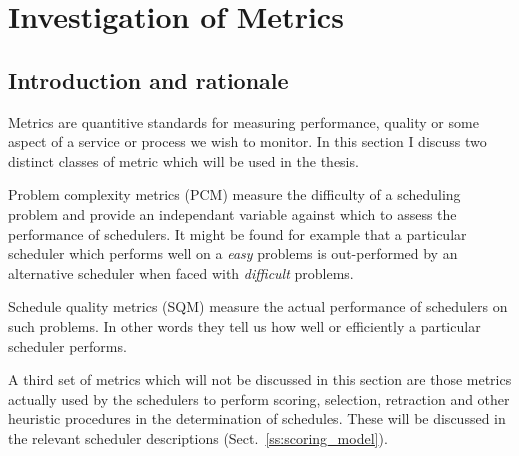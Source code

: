 \section{Investigation of Metrics}
\label{sect:metrics}

\subsection{Introduction and rationale}
Metrics are quantitive standards for measuring performance, quality or some aspect of a service or process we wish to monitor. In this section I discuss two distinct classes of metric which will be used in the thesis. 

Problem complexity metrics (PCM) measure the difficulty of a scheduling problem and provide an independant variable against which to assess the performance of schedulers. It might be found for example that a particular scheduler which performs well on a \emph{easy} problems is out-performed by an alternative scheduler when faced with \emph{difficult} problems. 

Schedule quality metrics (SQM) measure the actual performance of schedulers on such problems. In other words they tell us how well or efficiently a particular scheduler performs.

A third set of metrics which will not be discussed in this section are those metrics actually used by the schedulers to perform scoring, selection, retraction and other heuristic procedures in the determination of schedules. These will be discussed in the relevant scheduler descriptions (Sect.~\ref{ss:scoring_model}).

